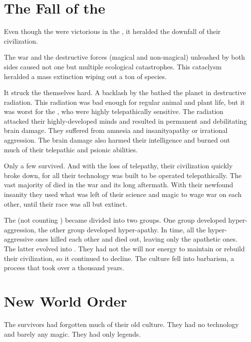 \section{The Fall of the \Ophidians}
Even though the \ophidians{} were victorious in the \firstbanewar{}, it  heralded the downfall of their civilization. 

The war and the destructive forces (magical and non-magical) unleashed by both sides caused not one but multiple ecological catastrophes. 
This cataclysm heralded a mass extinction wiping out a ton of species. 

It struck the \ophidians{} themselves hard. 
A backlash by the \banelords{} bathed the planet in destructive radiation. 
This radiation was bad enough for regular animal and plant life, but it was worst for the \ophidians, who were highly telepathically sensitive. 
The radiation attacked their highly-developed minds and resulted in permanent and debilitating brain damage. 
They suffered from amnesia and insanity\dash apathy or irrational aggression. 
The brain damage also harmed their intelligence and burned out much of their telepathic and psionic abilities. 

Only a few survived. 
And with the loss of telepathy, their civilization quickly broke down, for all their technology was built to be operated telepathically. 
The vast majority of \ophidians{} died in the war and its long aftermath. 
With their newfound insanity they used what was left of their science and magic to wage war on each other, until their race was all but extinct. 

The \ophidians{} (not counting \dragons) became divided into two groups. 
One group developed hyper-aggression, the other group developed hyper-apathy. 
In time, all the hyper-aggressive ones killed each other and died out, leaving only the apathetic ones. 
The latter evolved into \quiljaaran. 
They had not the will nor energy to maintain or rebuild their civilization, so it continued to decline. 
The \ophidian{} culture fell into barbarism, a process that took over a thousand years. 













\section{New World Order}
The survivors had forgotten much of their old culture.
They had no technology and barely any magic. 
They had only legends. 


